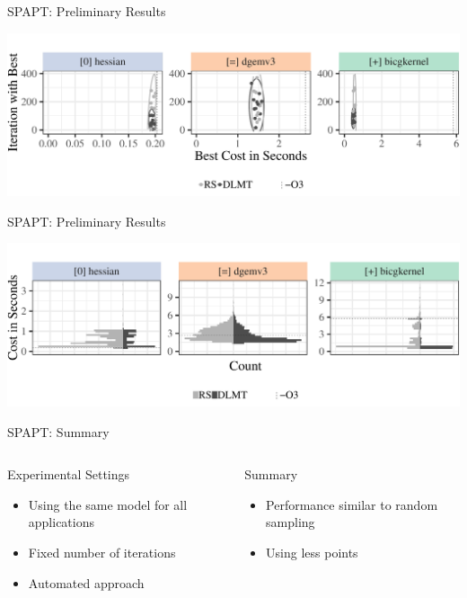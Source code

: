 \documentclass[10pt, compress, aspectratio=169, xcolor={table,usenames,dvipsnames}]{beamer}
\begin{document}
\begin{frame}[label={sec:org8249d84}]{SPAPT: Preliminary Results}
\begin{center}
\begin{center}
\includegraphics[width=.86\linewidth]{../../../img/iteration_best_comparison.pdf}
\end{center}
\end{center}
\end{frame}
\begin{frame}[label={sec:org1329958}]{SPAPT: Preliminary Results}
\begin{center}
\begin{center}
\includegraphics[width=.89\linewidth]{../../../img/split_histograms.pdf}
\end{center}
\end{center}
\end{frame}
\begin{frame}[label={sec:org8260e6e}]{SPAPT: Summary}
\begin{columns}
\begin{column}{0.5\columnwidth}
\begin{block}{Experimental Settings}
\begin{itemize}
\item Using the \alert{same model for all applications}
\item Fixed \alert{number of iterations}
\item \alert{Automated approach}
\end{itemize}
\end{block}
\end{column}

\begin{column}{0.5\columnwidth}
\begin{block}{Summary}
\begin{itemize}
\item Performance \alert{similar to random sampling}
\item Using \alert{less points}
\end{itemize}
\end{block}
\end{column}
\end{columns}
\end{frame}
\end{document}
